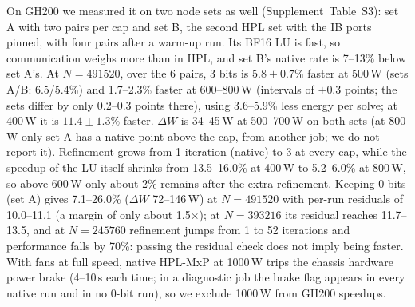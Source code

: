 \documentclass[conference]{IEEEtran}
\newcommand{\W}{\,W}
\newcommand{\pct}{\%}
\begin{document}
On GH200 we measured it on two node sets as well (Supplement~Table~S3): set A with two pairs per cap and set B,
the second HPL set with the IB ports pinned, with four pairs after a warm-up run. Its BF16 LU is fast, so communication
weighs more than in HPL, and set B's native rate is 7--13\pct{} below set A's. At $N=491520$, over the 6 pairs, 3 bits
is $5.8\pm0.7\pct$ faster at 500\W{} (sets A/B: 6.5/5.4\pct) and 1.7--2.3\pct{} faster at 600--800\W{} (intervals of
$\pm$0.3 points; the sets differ by only 0.2--0.3 points there), using 3.6--5.9\pct{} less energy per solve; at 400\W{}
it is $11.4\pm1.3\pct$ faster. $\Delta W$ is 34--45\W{} at 500--700\W{} on both sets (at 800\W{} only set A has a native
point above the cap, from another job; we do not report it). Refinement grows from 1 iteration (native) to 3 at every
cap, while the speedup of the LU itself shrinks from 13.5--16.0\pct{} at 400\W{} to 5.2--6.0\pct{} at 800\W, so above
600\W{} only about 2\pct{} remains after the extra refinement. Keeping 0 bits (set A) gives 7.1--26.0\pct{} ($\Delta W$
72--146\W) at $N=491520$ with per-run residuals of 10.0--11.1 (a margin of only about 1.5$\times$); at $N=393216$ its
residual reaches 11.7--13.5, and at $N=245760$ refinement jumps from 1 to 52 iterations and performance falls by
70\pct: passing the residual check does not imply being faster. With fans at full speed, native HPL-MxP at 1000\W{}
trips the chassis hardware power brake (4--10\,s each time; in a diagnostic job the brake flag appears in every native
run and in no 0-bit run), so we exclude 1000\W{} from GH200 speedups.
\end{document}
